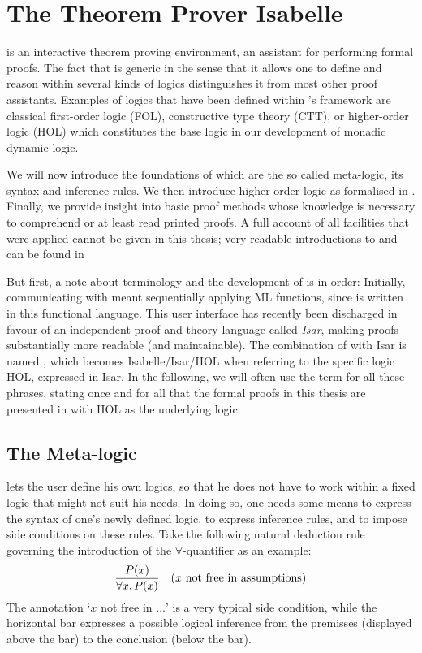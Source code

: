 
\chapter{The Theorem Prover Isabelle}
\label{cha:isabelle}

\Isabelle is an interactive theorem proving environment, \IE an assistant for
performing formal proofs. The fact that \Isabelle is generic in the sense that
it allows one to define and reason within several kinds of logics distinguishes
it from most other proof assistants. Examples of logics that have been defined
within \Isabelle's framework are classical first-order logic (FOL), constructive
type theory (CTT), or higher-order logic (HOL) which constitutes
the base logic in our development of monadic dynamic logic.

We will now introduce the foundations of \Isabelle which are the so called
meta-logic, its syntax and inference rules. We then introduce higher-order logic
as formalised in \Isabelle. Finally, we provide insight into basic proof methods
whose knowledge is necessary to comprehend or at least read printed \Isabelle
proofs. A full account of all facilities that were applied cannot be given in
this thesis; very readable introductions to \Isabelle and \IsabelleIsar can be
found in \cite{Nipkow03,IsabelleHOL}

But first, a note about terminology and the development of \Isabelle is in
order: Initially, communicating with \Isabelle meant sequentially applying ML
functions, since \Isabelle is written in this functional language. This user
interface has recently been discharged in favour of an independent proof and
theory language called \emph{Isar}, making proofs substantially more readable
(and maintainable). The combination of \Isabelle with Isar is named
\IsabelleIsar, which becomes Isabelle/Isar/HOL when referring to the
specific logic HOL, expressed in Isar. In the following, we will often use the
term \Isabelle for all these phrases, stating once and for all that the formal
proofs in this thesis are presented in \IsabelleIsar with HOL as the underlying
logic.


\section{The Meta-logic}
\label{sec:meta-logic}

\Isabelle lets the user define his own logics, so that he does not have to work
within a fixed logic that might not suit his needs. In doing so, one needs some
means to express the syntax of one's newly defined logic, to express inference
rules, and to impose side conditions on these rules. Take the following natural
deduction rule governing the introduction of the $\forall$-quantifier as an
example: 
\begin{equation}
  \frac{\displaystyle P(x)}{\displaystyle \forall x.\,P(x)} \quad \text{($x$ not free in assumptions)}
\end{equation}
The annotation `$x$ not free in $\ldots$' is a very typical side condition,
while the horizontal bar expresses a possible logical inference from the
premisses (displayed above the bar) to the conclusion (below the bar).

